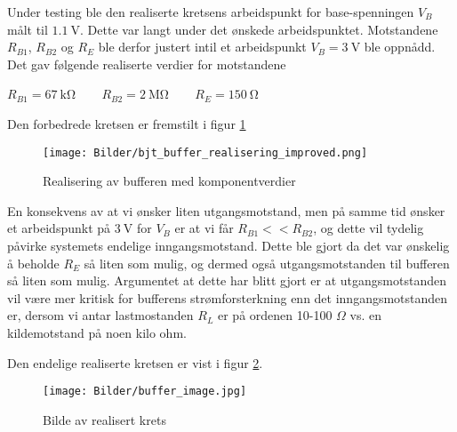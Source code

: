 Under testing ble den realiserte kretsens arbeidspunkt for base-spenningen $V_B$ målt til $\SI{1.1}{\volt}$. Dette 
var langt under det ønskede arbeidspunktet. Motstandene $R_{B1}$, $R_{B2}$ og $R_E$ ble derfor justert intil 
et arbeidspunkt $V_B = \SI{3}{\volt}$ ble oppnådd. Det gav følgende realiserte verdier for motstandene 
\begin{center}
    $R_{B1} = \SI{67}{\kilo\ohm}\:\:\:\:$ $\:\:\:\:R_{B2} = \SI{2}{\mega\ohm}\:\:\:\:$ $\:\:\:\:R_E = \SI{150}{\ohm}$
\end{center}

Den forbedrede kretsen er fremstilt i figur \ref{fig:buffer_realisering_forbedret}

\begin{figure}[H]
    \centering
    \texttt{[image: Bilder/bjt\_buffer\_realisering\_improved.png]}
    \caption{Realisering av bufferen med komponentverdier}
    \label{fig:buffer_realisering_forbedret}
\end{figure}

En konsekvens av at vi ønsker liten utgangsmotstand, men på samme tid ønsker et arbeidspunkt på $\SI{3}{\volt}$ for 
$V_{B}$ er at vi får $R_{B1} << R_{B2}$, og dette vil tydelig påvirke systemets endelige inngangsmotstand.
Dette ble gjort da det var ønskelig å beholde $R_E$ så liten som mulig, og dermed også utgangsmotstanden 
til bufferen så liten som mulig. Argumentet at dette har blitt gjort er at utgangsmotstanden vil være mer kritisk for bufferens strømforsterkning
enn det inngangsmotstanden er, dersom vi antar lastmostanden $R_L$ er på ordenen 10-100 $\Omega$ vs. en kildemotstand på noen kilo ohm.

Den endelige realiserte kretsen er vist i figur \ref{fig:buffer_image}.

\begin{figure}[H]
    \centering 
    \texttt{[image: Bilder/buffer\_image.jpg]}
    \caption{Bilde av realisert krets}
    \label{fig:buffer_image}
\end{figure}
